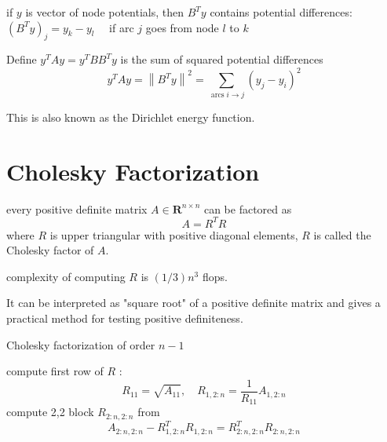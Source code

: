 \begin{theorem}
    if $ y $ is vector of node potentials, then $ B^{T} y $ contains potential differences:
$ \left(B^{T} y\right)_{j}=y_{k}-y_{l} \quad $ if arc $ j $ goes from node $ l $ to $ k $
\end{theorem}

\begin{theorem}
    Define $ y^{T} A y=y^{T} B B^{T} y $ is the sum of squared potential differences
$$
y^{T} A y=\left\|B^{T} y\right\|^{2}=\sum_{\operatorname{arcs} i \rightarrow j}\left(y_{j}-y_{i}\right)^{2}
$$

This is also known as the Dirichlet energy function.
\end{theorem}

\section{Cholesky Factorization}

\begin{theorem}
    every positive definite matrix $ A \in \mathbf{R}^{n \times n} $ can be factored as
$$
A=R^{T} R
$$
where $ R $ is upper triangular with positive diagonal elements, $ R $ is called the Cholesky factor of $ A $.
\end{theorem}

complexity of computing $ R $ is $ (1 / 3) n^{3} $ flops.

It can be interpreted as "square root" of a positive definite matrix and gives a practical method for testing positive definiteness.

\begin{algorithm}
    \caption{Cholesky factorization of order $ n-1 $}
    \KwIn{$$
    \begin{aligned}
    \left[\begin{array}{cc}
    A_{11} & A_{1,2: n} \\
    A_{2: n, 1} & A_{2: n, 2: n}
    \end{array}\right] &=\left[\begin{array}{cc}
    R_{11} & 0 \\
    R_{1,2: n}^{T} & R_{2: n, 2: n}^{T}
    \end{array}\right]\left[\begin{array}{cc}
    R_{11} & R_{1,2: n} \\
    0 & R_{2: n, 2: n}
    \end{array}\right] \\
    &=\left[\begin{array}{cc}
    R_{11}^{2} & \\
    R_{11} R_{1,2: n}^{T} & R_{1,2: n}^{T} R_{1,2: n}+R_{2: n, 2: n}^{T} R_{2: n, 2: n}
    \end{array}\right]
    \end{aligned}
    $$}
    
compute first row of $ R $ :
$$
R_{11}=\sqrt{A_{11}}, \quad R_{1,2: n}=\frac{1}{R_{11}} A_{1,2: n}
$$\;
compute 2,2 block $ R_{2: n, 2: n} $ from
$$
A_{2: n, 2: n}-R_{1,2: n}^{T} R_{1,2: n}=R_{2: n, 2: n}^{T} R_{2: n, 2: n}
$$

\end{algorithm}

